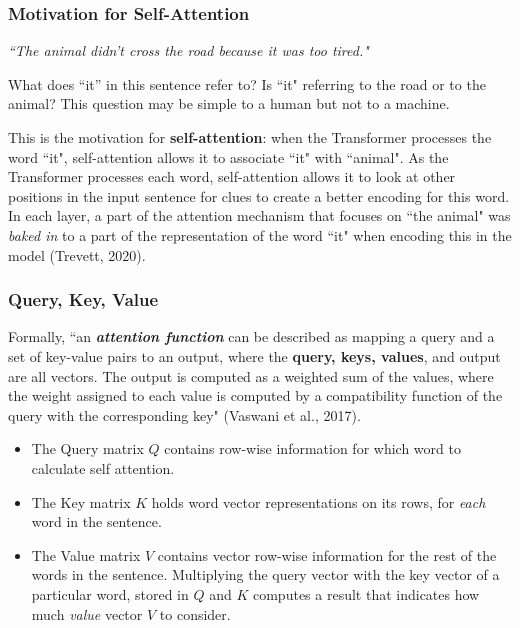 \subsubsection{Motivation for Self-Attention}

{\large \textit{``The animal didn't cross the road because it was too tired."}}


What does ``it” in this sentence refer to? Is ``it" referring to the road or to the animal? This question may be simple to a human but not to a machine.  

This is the motivation for \textbf{self-attention}: when the Transformer processes the word ``it", self-attention allows it to associate ``it" with ``animal". As the Transformer processes each word, self-attention allows it to look at other positions in the input sentence for clues to create a better encoding for this word. In each layer, a part of the attention mechanism that focuses on ``the animal" was \emph{baked in} to a part of the representation of the word ``it" when encoding this in the model (Trevett, 2020). 


\subsubsection{Query, Key, Value} \label{sec:QKV}

Formally, ``an \textbf{\textit{attention function}} can be described as mapping a query and a set of key-value pairs to an output, where the \textbf{query, keys, values}, and output are all vectors. The output is computed as a weighted sum of the values, where the weight assigned to each value is computed by a compatibility function of the query with the corresponding key" (Vaswani et al., 2017). 

\begin{itemize}
    \item The Query matrix $Q$ contains row-wise information for which word to calculate self attention. 
    
     \item The Key matrix $K$ holds word vector representations on its rows, for \emph{each} word in the sentence.
     
    \item The Value matrix $V$ contains vector row-wise information for the rest of the words in the sentence. Multiplying the query vector with the key vector of a particular word, stored in $Q$ and $K$ computes a result that indicates how much \emph{value} vector $V$ to consider.
\end{itemize}


